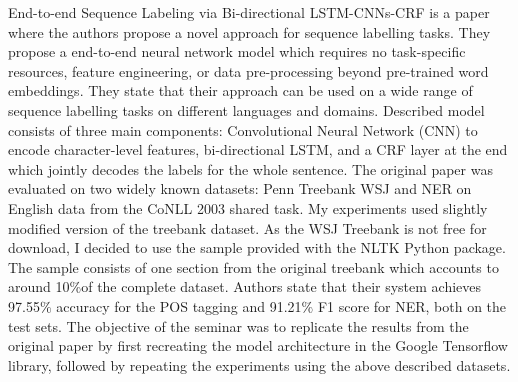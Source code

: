 End-to-end Sequence Labeling via Bi-directional LSTM-CNNs-CRF\cite{ma2016end} is a
paper where the authors propose a novel approach for sequence labelling tasks.
They propose a  end-to-end neural network model which requires no task-specific
resources, feature engineering, or data pre-processing beyond pre-trained word
embeddings. They state that their approach can be used on a wide range of
sequence labelling tasks on different languages and domains. Described model
consists of three main components: Convolutional Neural Network
(CNN)\cite{lecun1989backpropagation} to encode character-level features, bi-directional
LSTM, and a CRF layer at the end which jointly decodes the labels
for the whole sentence. The original paper was evaluated on two widely known
datasets: Penn Treebank WSJ\cite{marcus1993building} and NER on English data
from the CoNLL 2003 shared task\cite{tjong2003introduction}. My experiments used slightly
modified version of the treebank dataset. As the WSJ Treebank is not free for
download, I decided to use the sample provided with the NLTK Python
package\cite{bird2006nltk}. The sample consists of one section from the original
treebank which accounts to around 10$\%$of the complete dataset.
Authors state that their system achieves 97.55$\%$ accuracy for the POS tagging
and 91.21$\%$ F1 score for NER, both on the test sets. The objective of the seminar
was to replicate the results from the original paper by first recreating the
model architecture in the Google Tensorflow library\cite{abadi2016tensorflow},
followed by repeating the experiments using the above described datasets.


